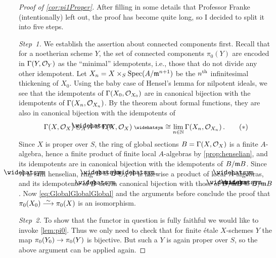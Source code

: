 \begin{proof}[Proof of \cref{cor:pi1Proper}]
	After filling in some details that Professor Franke (intentionally) left out, the proof has become quite long, so I decided to split it into five steps.
	
	\emph{Step~1.} We establish the assertion about connected components first. Recall that for a noetherian scheme $Y$, the set of connected components $\pi_0(Y)$ are encoded in $\operatorname{\Gamma}(Y,\mathcal{O}_Y)$ as the \enquote{minimal} idempotents, i.e., those that do not divide any other idempotent. Let $X_n=X\times_S\operatorname{Spec} (A/\mathfrak{m}^{n+1})$ be the $n^{\text{th}}$ infinitesimal thickening of $X_0$. Using the baby case of Hensel's lemma for nilpotent ideals, we see that the idempotents of $\operatorname{\Gamma}(X_0,\mathcal{O}_{X_0})$ are in canonical bijection with the idempotents of $\operatorname{\Gamma}(X_n,\mathcal{O}_{X_n})$. By the theorem about formal functions, they are also in canonical bijection with the idempotents of
	\begin{equation}\label{eq:GlobalGlobalGlobal}
		\Global(X,\Oo_X)\otimes_A\roof{A}\cong \Global(X,\Oo_X)^\complete\cong \limit_{n\in\IN}\Global(X_n,\Oo_{X_n})\,.\tag{$*$}
	\end{equation}
	Since $X$ is proper over $S$, the ring of global sections $B=\operatorname{\Gamma}(X,\mathcal{O}_X)$ is a finite $A$-algebra, hence a finite product of finite local $A$-algebras by \cref{prop:henselian}, and its idempotents are in canonical bijection with the idempotents of $B/\mathfrak{m} B$. Since $\roof{A}$ is still henselian, ring $\roof{B}\cong B\otimes_A\roof{A}$ is likewise a product of local $\roof{A}$-algebras, and its idempotents of $\roof{B}$ are in canonical bijection with those of $\roof{B}/\mm\roof{B}\cong B/\mm B$. Now \cref{eq:GlobalGlobalGlobal} and the arguments before conclude the proof that $\pi_0(X_0)\isomorphism\pi_0(X)$ is an isomorphism.
	
	\emph{Step~2.} To show that the functor in question is fully faithful we would like to invoke \cref{lem:pi0}. Thus we only need to check that for finite étale $X$-schemes $Y$ the map $\pi_0(Y_0)\morphism\pi_0(Y)$ is bijective. But such a $Y$ is again proper over $S$, so the above argument can be applied again.
	

\end{proof}
